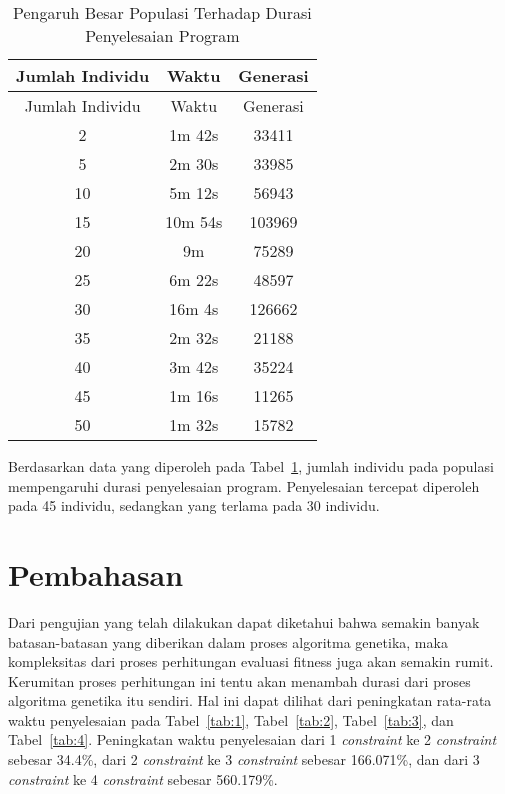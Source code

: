 \begin{longtable}[c]{|c|c|c|}
  \caption{Pengaruh Besar Populasi Terhadap Durasi Penyelesaian Program}
  \label{tab:populasi}\\
  \hline
  \rowcolor[HTML]{9B9B9B} 
  Jumlah Individu & Waktu   & Generasi \\ \hline
  \endfirsthead
  \hline
  Jumlah Individu & Waktu   & Generasi \\ \hline
  \endhead
  2               & 1m 42s  & 33411     \\ \hline
  5               & 2m 30s  & 33985    \\ \hline
  10              & 5m 12s  & 56943    \\ \hline
  15              & 10m 54s & 103969   \\ \hline
  20              & 9m      & 75289    \\ \hline
  25              & 6m 22s  & 48597    \\ \hline
  30              & 16m 4s  & 126662   \\ \hline
  35              & 2m 32s  & 21188    \\ \hline
  40              & 3m 42s  & 35224    \\ \hline
  45              & 1m 16s  & 11265    \\ \hline
  50              & 1m 32s  & 15782    \\ \hline
  \end{longtable}

Berdasarkan data yang diperoleh pada Tabel~\ref{tab:populasi}, jumlah individu pada populasi mempengaruhi durasi penyelesaian program. 
Penyelesaian tercepat diperoleh pada 45 individu, sedangkan yang terlama pada 30 individu.
\section{Pembahasan}
\label{sec:Pembahasan}

Dari pengujian yang telah dilakukan dapat diketahui bahwa semakin banyak batasan-batasan yang diberikan dalam proses algoritma genetika, maka kompleksitas dari proses \linebreak perhitungan evaluasi fitness juga akan semakin rumit. 
Kerumitan proses perhitungan ini tentu akan menambah durasi dari proses algoritma genetika itu sendiri. 
Hal ini dapat dilihat dari \linebreak peningkatan rata-rata waktu penyelesaian pada Tabel~\ref{tab:1}, Tabel~\ref{tab:2}, Tabel~\ref{tab:3}, dan Tabel~\ref{tab:4}.
Peningkatan waktu penyelesaian dari 1 \textit{constraint} ke 2 \textit{constraint} sebesar 34.4\%, dari 2 \linebreak \textit{constraint} ke 3 \textit{constraint} sebesar 166.071\%, dan dari 3 \textit{constraint} ke 4 \textit{constraint} sebesar 560.179\%.

